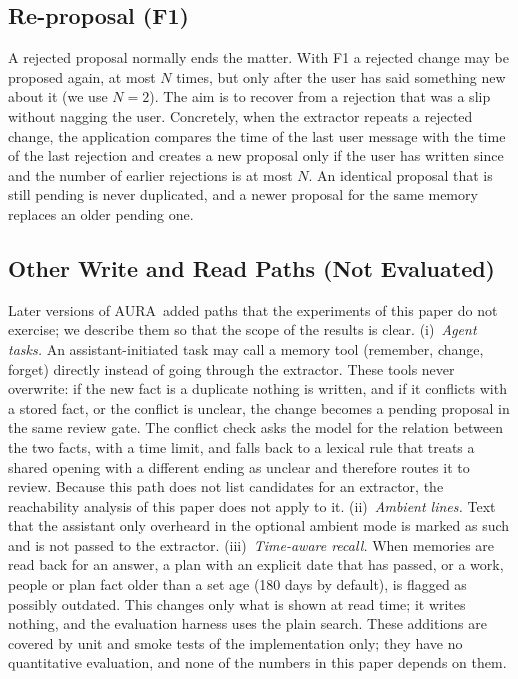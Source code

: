 \IfFileExists{IEEEtran.cls}{\documentclass[journal]{IEEEtran}\def\HAVEIEEE{1}}{\documentclass[10pt,twocolumn]{article}\usepackage[margin=0.7in,columnsep=0.25in]{geometry}}
\newcommand{\aura}{AURA}
\begin{document}
\subsection{Re-proposal (F1)}
A rejected proposal normally ends the matter. With F1 a rejected change may be proposed again, at most $N$ times, but only after the user has said something new about it (we use $N=2$). The aim is to recover from a rejection that was a slip without nagging the user. Concretely, when the extractor repeats a rejected change, the application compares the time of the last user message with the time of the last rejection and creates a new proposal only if the user has written since and the number of earlier rejections is at most $N$. An identical proposal that is still pending is never duplicated, and a newer proposal for the same memory replaces an older pending one.

\subsection{Other Write and Read Paths (Not Evaluated)}
\label{sec:otherpaths}
Later versions of \aura\ added paths that the experiments of this paper do not exercise; we describe them so that the scope of the results is clear. (i)~\emph{Agent tasks.} An assistant-initiated task may call a memory tool (remember, change, forget) directly instead of going through the extractor. These tools never overwrite: if the new fact is a duplicate nothing is written, and if it conflicts with a stored fact, or the conflict is unclear, the change becomes a pending proposal in the same review gate. The conflict check asks the model for the relation between the two facts, with a time limit, and falls back to a lexical rule that treats a shared opening with a different ending as unclear and therefore routes it to review. Because this path does not list candidates for an extractor, the reachability analysis of this paper does not apply to it. (ii)~\emph{Ambient lines.} Text that the assistant only overheard in the optional ambient mode is marked as such and is not passed to the extractor. (iii)~\emph{Time-aware recall.} When memories are read back for an answer, a plan with an explicit date that has passed, or a work, people or plan fact older than a set age (180 days by default), is flagged as possibly outdated. This changes only what is shown at read time; it writes nothing, and the evaluation harness uses the plain search. These additions are covered by unit and smoke tests of the implementation only; they have no quantitative evaluation, and none of the numbers in this paper depends on them.
\end{document}

